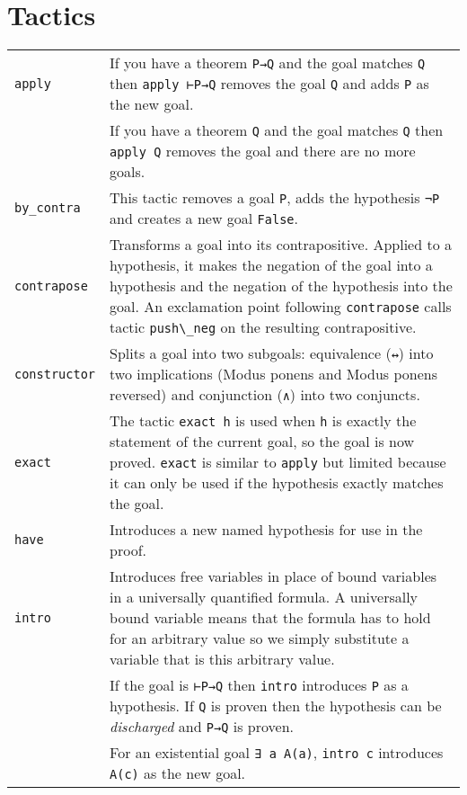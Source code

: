 \newpage


\section{Tactics}

\begin{tabular}{p{}|@{\hspace{1em}}p{}}
\hline
\Verb+apply+&If you have a theorem \Verb+P→Q+ and the goal matches \Verb+Q+ then \Verb+apply ⊢P→Q+ removes the goal \Verb+Q+ and adds \Verb+P+ as the new goal.\\
&If you have a theorem \Verb+Q+ and the goal matches \Verb+Q+ then \Verb+apply Q+ removes the goal and there are no more goals.\\\hline

\Verb+by_contra+&This tactic removes a goal \Verb+P+, adds the hypothesis \Verb+¬P+ and creates a new goal \Verb+False+.\\\hline

\Verb+contrapose+&Transforms a goal into its contrapositive. Applied to a hypothesis, it makes the negation of the goal into a hypothesis and the negation of the hypothesis into the goal. 
An exclamation point following \Verb+contrapose+ calls tactic \Verb+push\_neg+ on the resulting contrapositive.\\\hline

\Verb+constructor+&Splits a goal into two subgoals: equivalence (\Verb+↔+) into two implications (Modus ponens and Modus ponens reversed) and conjunction (\Verb+∧+) into two conjuncts.\\\hline

\Verb+exact+&The tactic \Verb+exact h+ is used when \Verb+h+ is exactly the statement of the current goal, so the goal is now proved. \Verb+exact+ is similar to \Verb+apply+ but limited because it can only be used if the hypothesis exactly matches the goal.\\\hline

\Verb+have+&Introduces a new named hypothesis for use in the proof.\\\hline

\Verb+intro+&Introduces free variables in place of bound variables in a universally quantified formula. A universally bound variable means that the formula has to hold for an arbitrary value so we simply substitute a variable that is this arbitrary value.\\
&If the goal is \Verb+⊢P→Q+ then \Verb+intro+ introduces \Verb+P+ as a hypothesis. If \Verb+Q+ is proven then the hypothesis can be \emph{discharged} and \Verb+P→Q+ is proven.\\
&For an existential goal \Verb+∃ a A(a)+, \Verb+intro c+ introduces \Verb+A(c)+ as the new goal.\\\hline


\end{tabular}
